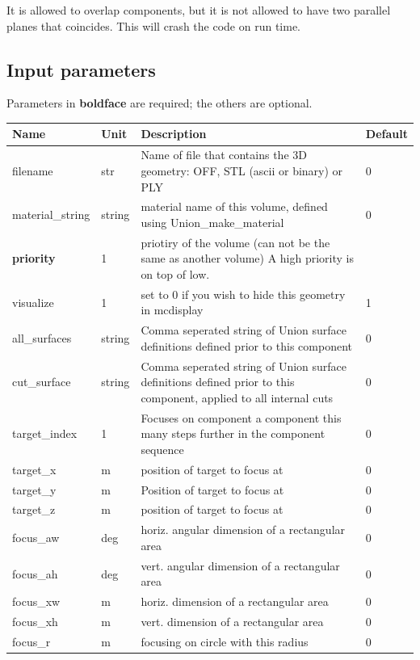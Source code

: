 It is allowed to overlap components, but it is not allowed to have two parallel planes that coincides. This will crash the code on run time.

\subsection*{Input parameters}
Parameters in \textbf{boldface} are required; the others are optional.

\begin{longtable}{p{}p{}p{}p{}}
\toprule
\textbf{Name} & \textbf{Unit} & \textbf{Description} & \textbf{Default} \\
\midrule
\endhead
filename & str & Name of file that contains the 3D geometry: OFF, STL (ascii or binary) or PLY & 0 \\
material\_string & string & material name of this volume, defined using Union\_make\_material & 0 \\
\textbf{priority} & 1 & priotiry of the volume (can not be the same as another volume) A high priority is on top of low. &  \\
visualize & 1 & set to 0 if you wish to hide this geometry in mcdisplay & 1 \\
all\_surfaces & string & Comma seperated string of Union surface definitions defined prior to this component & 0 \\
cut\_surface & string & Comma seperated string of Union surface definitions defined prior to this component, applied to all internal cuts & 0 \\
target\_index & 1 & Focuses on component a component this many steps further in the component sequence & 0 \\
target\_x & m & position of target to focus at & 0 \\
target\_y & m & Position of target to focus at & 0 \\
target\_z & m & position of target to focus at & 0 \\
focus\_aw & deg & horiz. angular dimension of a rectangular area & 0 \\
focus\_ah & deg & vert. angular dimension of a rectangular area & 0 \\
focus\_xw & m & horiz. dimension of a rectangular area & 0 \\
focus\_xh & m & vert. dimension of a rectangular area & 0 \\
focus\_r & m & focusing on circle with this radius & 0 \\

\end{longtable}
